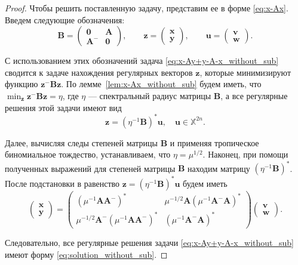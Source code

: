 \documentclass[specialist,
               substylefile = spbu.rtx,
               subf,href,colorlinks=true, 12pt]{disser}
\theoremstyle{definition}
\begin{document}
\begin{proof}
Чтобы решить поставленную задачу, представим ее в форме \eqref{eq:x-Ax}. Введем следующие обозначения:
\begin{equation*}
\bm{B}
=
\begin{pmatrix}
\bm{0} &\bm{A}\\
\bm{A}^{-} &\bm{0}
\end{pmatrix},
\qquad
\bm{z}
=
\begin{pmatrix}
\bm{x}\\
\bm{y}
\end{pmatrix},
\qquad
\bm{u}
=
\begin{pmatrix}
\bm{v}\\
\bm{w}
\end{pmatrix}.
\end{equation*}

С использованием этих обозначений задача \eqref{eq:x-Ay+y-A-x_without_sub} сводится к задаче нахождения регулярных векторов $\bm{z}$, которые минимизируют функцию $\bm{z}^{-}\bm{B}\bm{z}$. По лемме~\ref{lem:x-Ax_without_sub} будем иметь, что $\min_{\bm{z}}\bm{z}^{-}\bm{B}\bm{z}=\eta$, где $\eta$ --- спектральный радиус матрицы $\bm{B}$, а все регулярные решения этой задачи имеют вид 
\begin{equation*}
\bm{z}=(\eta^{-1}\bm{B})^{\ast}\bm{u},
\quad
\bm{u}\in\mathbb{X}^{2n}.
\end{equation*}

Далее, вычисляя следы степеней матрицы $\bm{B}$ и применяя тропическое биномиальное тождество, устанавливаем, что $\eta=\mu^{1/2}$. Наконец, при помощи полученных выражений для степеней матрицы $\bm{B}$ находим матрицу $(\eta^{-1}\bm{B})^{\ast}$. После подстановки в равенство $\bm{z}=(\eta^{-1}\bm{B})^{\ast}\bm{u}$ будем иметь
\begin{equation*}
\begin{pmatrix}
\bm{x}\\
\bm{y}
\end{pmatrix}
=
\begin{pmatrix}
(\mu^{-1}\bm{A}\bm{A}^{-})^{\ast} 
&\mu^{-1/2}\bm{A}(\mu^{-1}\bm{A}^{-}\bm{A})^{\ast}\\
\mu^{-1/2}\bm{A}^{-}(\mu^{-1}\bm{A}\bm{A}^{-})^{\ast} 
&(\mu^{-1}\bm{A}^{-}\bm{A})^{\ast}
\end{pmatrix}
\begin{pmatrix}
\bm{v}\\
\bm{w}
\end{pmatrix}.
\end{equation*} 

Следовательно, все регулярные решения задачи \eqref{eq:x-Ay+y-A-x_without_sub} имеют форму \eqref{eq:solution_without_sub}.
\end{proof}
\end{document}

